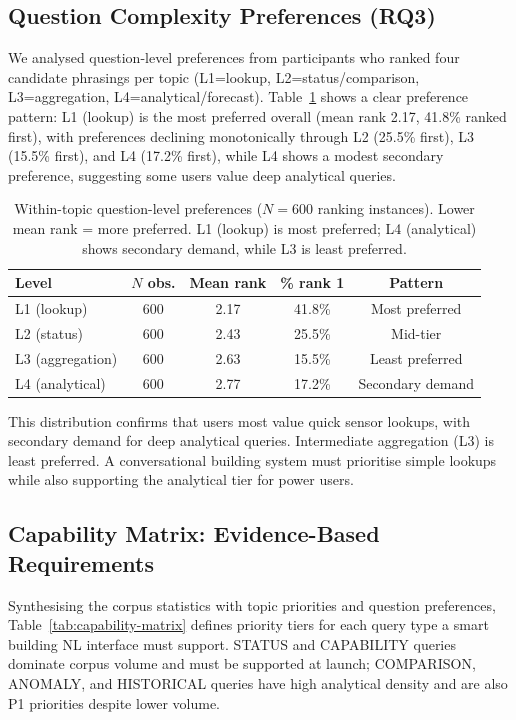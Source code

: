 \documentclass[acmsmall]{acmart}
\begin{document}
\subsection{Question Complexity Preferences (RQ3)}
\label{sec:question-prefs}

We analysed question-level preferences from participants who ranked four candidate phrasings per topic (L1=lookup, L2=status/comparison, L3=aggregation, L4=analytical/forecast). Table~\ref{tab:question-preferences} shows a clear preference pattern: L1 (lookup) is the most preferred overall (mean rank 2.17, 41.8\% ranked first), with preferences declining monotonically through L2 (25.5\% first), L3 (15.5\% first), and L4 (17.2\% first), while L4 shows a modest secondary preference, suggesting some users value deep analytical queries.

\begin{table}[t]
\centering
\caption{Within-topic question-level preferences ($N=600$ ranking instances). Lower mean rank = more preferred. L1 (lookup) is most preferred; L4 (analytical) shows secondary demand, while L3 is least preferred.}
\label{tab:question-preferences}
\small
\begin{tabular}{@{}lcccc@{}}
\toprule
\textbf{Level} & \textbf{$N$ obs.} & \textbf{Mean rank} & \textbf{\% rank 1} & \textbf{Pattern} \\
\midrule
L1 (lookup)       & 600 & 2.17 & 41.8\% & Most preferred \\
L2 (status)       & 600 & 2.43 & 25.5\% & Mid-tier \\
L3 (aggregation)  & 600 & 2.63 & 15.5\% & Least preferred \\
L4 (analytical)   & 600 & 2.77 & 17.2\% & Secondary demand \\
\bottomrule
\end{tabular}
\end{table}

This distribution confirms that users most value quick sensor lookups, with secondary demand for deep analytical queries. Intermediate aggregation (L3) is least preferred. A conversational building system must prioritise simple lookups while also supporting the analytical tier for power users.

\subsection{Capability Matrix: Evidence-Based Requirements}
\label{sec:capability-matrix}

Synthesising the corpus statistics with topic priorities and question preferences, Table~\ref{tab:capability-matrix} defines priority tiers for each query type a smart building NL interface must support. STATUS and CAPABILITY queries dominate corpus volume and must be supported at launch; COMPARISON, ANOMALY, and HISTORICAL queries have high analytical density and are also P1 priorities despite lower volume.
\end{document}

